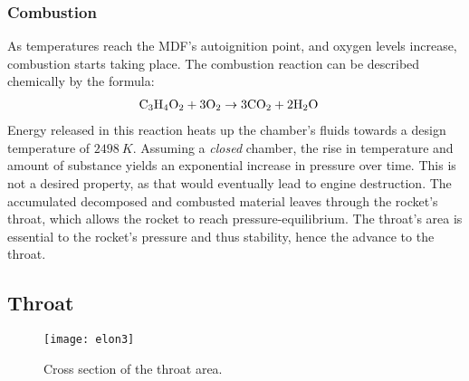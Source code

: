 	\subsubsection{Combustion}

		As temperatures reach the MDF's autoignition point, and oxygen levels increase, combustion starts taking place. The combustion reaction can be described chemically by the formula:
			\begin{align}
				\mathrm{C_3 H_4 O_2 + 3 O_2} &\rightarrow \mathrm{3 CO_2 + 2H_2O}
			\end{align}
		Energy released in this reaction heats up the chamber's fluids towards a design temperature of $\SI{2498}{K}$. Assuming a \emph{closed} chamber, the rise in temperature and amount of substance yields an exponential increase in pressure over time. This is not a desired property, as that would eventually lead to engine destruction. The accumulated decomposed and combusted material leaves through the rocket's throat, which allows the rocket to reach pressure-equilibrium. The throat's area is essential to the rocket's pressure and thus stability, hence the advance to the throat.

\subsection{Throat}

	\begin{figure}
		\texttt{[image: elon3]}
		\caption{Cross section of the throat area.}
		\label{fig:crossthroat}
	\end{figure}

